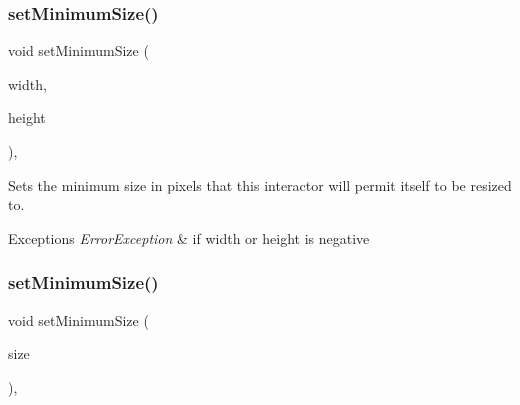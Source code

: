 \mbox{\label{classsgl_1_1GInteractor_a0cf428e207b7f22cc08138a90b1b87b2}} 
\subsubsection{\texorpdfstring{set\+Minimum\+Size()}{setMinimumSize()}\hspace{0.1cm}{\footnotesize\ttfamily [1/2]}}
{\footnotesize\ttfamily void set\+Minimum\+Size (\begin{DoxyParamCaption}\item[{double}]{width,  }\item[{double}]{height }\end{DoxyParamCaption})\hspace{0.3cm}{\ttfamily [virtual]}, {\ttfamily [inherited]}}



Sets the minimum size in pixels that this interactor will permit itself to be resized to. 


\begin{DoxyExceptions}{Exceptions}
{\em Error\+Exception} & if width or height is negative \\
\hline
\end{DoxyExceptions}
\mbox{\label{classsgl_1_1GInteractor_a3b1046117ac6cb7abe467e00ba8a81f4}} 
\subsubsection{\texorpdfstring{set\+Minimum\+Size()}{setMinimumSize()}\hspace{0.1cm}{\footnotesize\ttfamily [2/2]}}
{\footnotesize\ttfamily void set\+Minimum\+Size (\begin{DoxyParamCaption}\item[{const \mbox{\hyperlink{structsgl_1_1GDimension}{G\+Dimension}} \&}]{size }\end{DoxyParamCaption})\hspace{0.3cm}{\ttfamily [virtual]}, {\ttfamily [inherited]}}



